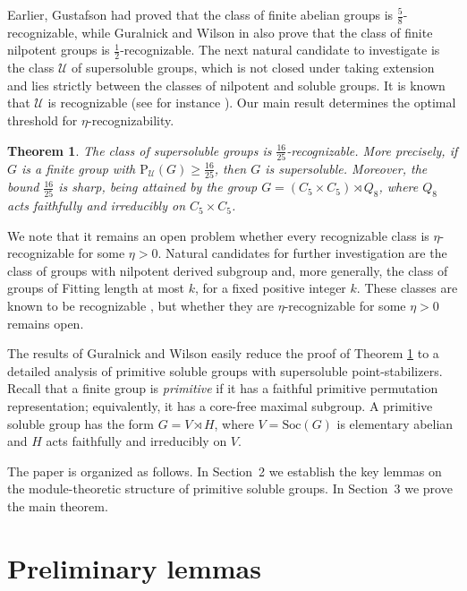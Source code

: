 \documentclass{amsart}
\newtheorem{theorem}{Theorem}
\newcommand{\Psu}{\mathrm{P}_{\mathcal{U}}}
\begin{document}
	Earlier, 
	Gustafson \cite{Gus73} had proved that the class of finite  abelian 
	groups is $\frac{5}{8}$-recognizable, while Guralnick and Wilson in \cite{GW00} also prove that the class of finite nilpotent groups is $\frac{1}{2}$-recognizable. The next natural candidate to investigate is the class 
	$\mathcal{U}$ of supersoluble groups, which is not closed under taking extension and lies strictly 
	between the classes of nilpotent and soluble groups. 
	It is known that $\mathcal{U}$ is recognizable 
	(see for instance \cite[Example 1]{BH09}).
	 Our main result determines the 
	optimal threshold for $\eta$-recognizability.
	

	

	
	\begin{theorem}\label{thm:main}
		The class of supersoluble groups is $\frac{16}{25}$-recognizable. 
		More precisely, if $G$ is a finite group with 
		$\Psu(G) \geq \frac{16}{25}$, then $G$ is supersoluble. 
		Moreover, the bound $\frac{16}{25}$ is sharp, being attained 
		by the group $G = (C_5 \times C_5) \rtimes Q_8$, where $Q_8$ 
		acts faithfully and irreducibly on $C_5 \times C_5$.
	\end{theorem}
	
We note that it remains an open problem whether every 
recognizable class is $\eta$-recognizable for some 
$\eta > 0$. Natural candidates for further investigation 
are the class of groups with nilpotent derived subgroup 
and, more generally, the class of groups of Fitting length 
at most $k$, for a fixed positive integer $k$. These classes 
are known to be recognizable \cite[Examples 2 and 3]{BH09}, 
but whether they are $\eta$-recognizable for some $\eta > 0$ 
remains open.
	
	The results of Guralnick and Wilson easily reduce the proof of Theorem \ref{thm:main} to 
	 a detailed analysis of primitive soluble
	  groups with supersoluble point-stabilizers. 
	Recall that a finite group is \textit{primitive} if it has a 
	faithful primitive permutation representation; equivalently, 
	it has a core-free maximal subgroup. A primitive soluble group 
	has the form $G = V \rtimes H$, where $V = \mathrm{Soc}(G)$ is 
	elementary abelian and $H$ acts faithfully and irreducibly on $V$.
	
	The paper is organized as follows. In Section~2 we establish 
	the key lemmas on the module-theoretic structure of primitive 
	soluble groups. In Section~3 we prove the main theorem.
	
	\section{Preliminary lemmas}
	
\end{document}
